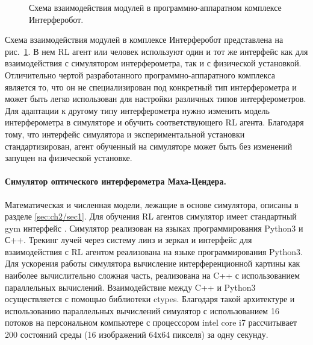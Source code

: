 \begin{figure}[ht]
\caption{Схема взаимодействия модулей в программно-аппаратном комплексе Интерферобот.}
\label{fig:interf_complex}
\end{figure}

Схема взаимодействия модулей в комплексе Интерферобот представлена на рис.~\ref{fig:interf_complex}. В нем RL агент или человек используют один и тот же интерфейс как для взаимодействия с симулятором интерферометра, так и с физической установкой. Отличительно чертой разработанного программно-аппаратного комплекса является то, что он не специализирован под конкретный тип интерферометра и может быть легко использован для настройки различных типов интерферометров. Для адаптации к другому типу интерферометра нужно изменить модель интерферометра в симуляторе и обучить соответствующего RL агента. Благодаря тому, что интерфейс симулятора и экспериментальной установки стандартизирован, агент обученный на симуляторе может быть без изменений запущен на физической установке. 

\paragraph{Симулятор оптического интерферометра Маха-Цендера.}
Математическая и численная модели, лежащие в основе симулятора, описаны в разделе \ref{sec:ch2/sec1}. Для обучения RL агентов симулятор имеет стандартный gym интерфейс \cite{brockman2016openai}. Симулятор реализован на языках программирования Python3 и С++. Трекинг лучей через систему линз и зеркал и интерфейс для взаимодействия с RL агентом реализована на языке программирования Python3. Для ускорения работы симулятора вычисление интерференционной картины как наиболее вычислительно сложная часть, реализована на C++ с использованием параллельных вычислений. Взаимодействие между C++ и Python3 осуществляется с помощью библиотеки ctypes. Благодаря такой архитектуре и использованию параллельных вычислений симулятор с использованием 16 потоков на персональном компьютере с процессором intel core i7 рассчитывает 200 состояний среды (16 изображений 64х64 пикселя) за одну секунду. 

